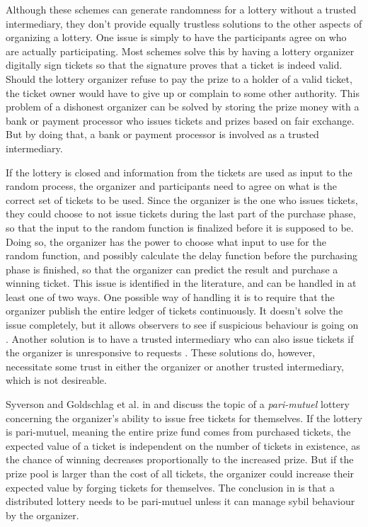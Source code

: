 Although these schemes can generate randomness for a lottery without a trusted intermediary, they don't provide equally trustless solutions to the other aspects of organizing a lottery. One issue is simply to have the participants agree on who are actually participating. Most schemes solve this by having a lottery organizer digitally sign tickets so that the signature proves that a ticket is indeed valid. Should the lottery organizer refuse to pay the prize to a holder of a valid ticket, the ticket owner would have to give up or complain to some other authority. This problem of a dishonest organizer can be solved by storing the prize money with a bank or payment processor who issues tickets and prizes based on fair exchange. But by doing that, a bank or payment processor is involved as a trusted intermediary. 

If the lottery is closed and information from the tickets are used as input to the random process, the organizer and participants need to agree on what is the correct set of tickets to be used. Since the organizer is the one who issues tickets, they could choose to not issue tickets during the last part of the purchase phase, so that the input to the random function is finalized before it is supposed to be. Doing so, the organizer has the power to choose what input to use for the random function, and possibly calculate the delay function before the purchasing phase is finished, so that the organizer can predict the result and purchase a winning ticket. This issue is identified in the literature, and can be handled in at least one of two ways. One possible way of handling it is to require that the organizer publish the entire ledger of tickets continuously. It doesn't solve the issue completely, but it allows observers to see if suspicious behaviour is going on \cite{syverson_weakly_1998}. Another solution is to have a trusted intermediary who can also issue tickets if the organizer is unresponsive to requests \cite{zhou_playing_2001}. These solutions do, however, necessitate some trust in either the organizer or another trusted intermediary, which is not desireable.

Syverson and Goldschlag et al. in \cite{syverson_weakly_1998} and \cite{goldschlag_temporarily_2010} discuss the topic of a \emph{pari-mutuel} lottery concerning the organizer's ability to issue free tickets for themselves. If the lottery is pari-mutuel, meaning the entire prize fund comes from purchased tickets, the expected value of a ticket is independent on the number of tickets in existence, as the chance of winning decreases proportionally to the increased prize. But if the prize pool is larger than the cost of all tickets, the organizer could increase their expected value by forging tickets for themselves. The conclusion in \cite{syverson_weakly_1998, goldschlag_temporarily_2010} is that a distributed lottery needs to be pari-mutuel unless it can manage sybil behaviour by the organizer.

